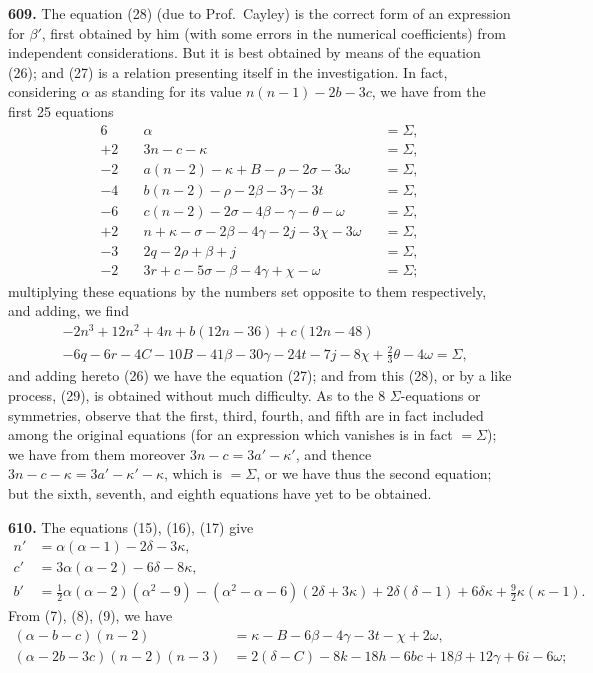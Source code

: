 \documentclass[11pt,a4paper]{article}
\newcommand{\artno}[1]{\textbf{#1.}\quad}
\begin{document}
\artno{609} The equation (28) (due to Prof.\ Cayley) is the correct form of
an expression for $\beta'$, first obtained by him (with some errors in the
numerical coefficients) from independent considerations.  But it is best
obtained by means of the equation (26); and (27) is a relation presenting
itself in the investigation. In fact, considering $\alpha$ as standing for
its value $n(n-1) - 2b - 3c$, we have from the first 25 equations
\begin{align*}
 6 \quad & \alpha &&= \Sigma, \\
 +2 \quad & 3n - c - \kappa &&= \Sigma, \\
 -2 \quad & a(n-2) - \kappa + B - \rho - 2\sigma - 3\omega &&= \Sigma, \\
 -4 \quad & b(n-2) - \rho - 2\beta - 3\gamma - 3t &&= \Sigma, \\
 -6 \quad & c(n-2) - 2\sigma - 4\beta - \gamma - \theta - \omega &&= \Sigma, \\
 +2 \quad & n + \kappa - \sigma - 2\beta - 4\gamma - 2j - 3\chi - 3\omega
            &&= \Sigma, \\
 -3 \quad & 2q - 2\rho + \beta + j &&= \Sigma, \\
 -2 \quad & 3r + c - 5\sigma - \beta - 4\gamma + \chi - \omega &&= \Sigma;
\end{align*}
multiplying these equations by the numbers set opposite to them respectively,
and adding, we find
\begin{align*}
 & - 2n^{3} + 12n^{2} + 4n + b(12n - 36) + c(12n - 48) \\
 & - 6q - 6r - 4C - 10B - 41\beta - 30\gamma - 24t - 7j - 8\chi
    + \tfrac{2}{3}\theta - 4\omega = \Sigma,
\end{align*}
and adding hereto (26) we have the equation (27); and from this (28), or by a
like process, (29), is obtained without much difficulty.  As to the 8
$\Sigma$-equations or symmetries, observe that the first, third, fourth, and
fifth are in fact included among the original equations (for an expression
which vanishes is in fact $= \Sigma$); we have from them moreover
$3n - c = 3a' - \kappa'$, and thence $3n - c - \kappa = 3a' - \kappa' - \kappa$,
which is $= \Sigma$, or we have thus the second equation; but the sixth,
seventh, and eighth equations have yet to be obtained.

\medskip

\artno{610} The equations (15), (16), (17) give
\begin{align*}
  n' & = \alpha(\alpha - 1) - 2\delta - 3\kappa, \\
  c' & = 3\alpha(\alpha - 2) - 6\delta - 8\kappa, \\
  b' & = \tfrac{1}{2}\alpha(\alpha-2)(\alpha^{2}-9)
        - (\alpha^{2}-\alpha-6)(2\delta + 3\kappa) + 2\delta(\delta-1)
        + 6\delta\kappa + \tfrac{9}{2}\kappa(\kappa-1).
\end{align*}
From (7), (8), (9), we have
\begin{align*}
  (\alpha - b - c)(n-2) & = \kappa - B - 6\beta - 4\gamma - 3t - \chi + 2\omega, \\
  (\alpha - 2b - 3c)(n-2)(n-3) & = 2(\delta - C) - 8k - 18h - 6bc
       + 18\beta + 12\gamma + 6i - 6\omega;
\end{align*}
\end{document}
